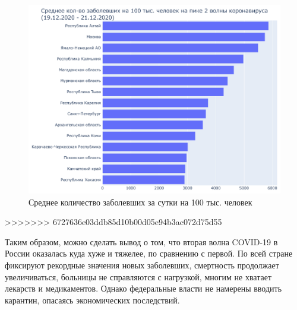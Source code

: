 \documentclass[a4paper, 12pt]{extarticle}
\begin{document}
\begin{figure}[h]
    \centering
    \includegraphics[scale=0.6]{../plots/6total_confirmed_per_100k_bar_plot_2wave.pdf}
    \caption{Среднее количество заболевших за сутки на 100 тыс. человек}
    \label{fig:average_confirmed_per_100k_2wave}
\end{figure}
>>>>>>> 6727636e03ddb85d10b00d05e94b3ac072d75d55

Таким образом, можно сделать вывод о том, что вторая волна COVID-19 в России оказалась куда хуже и тяжелее, по сравнению с первой. По всей стране фиксируют рекордные значения новых заболевших, смертность продолжает увеличиваться, больницы не справляются с нагрузкой, многим не хватает лекарств и медикаментов. Однако федеральные власти не намерены вводить карантин, опасаясь экономических последствий.
\newpage

{}

\end{document}
